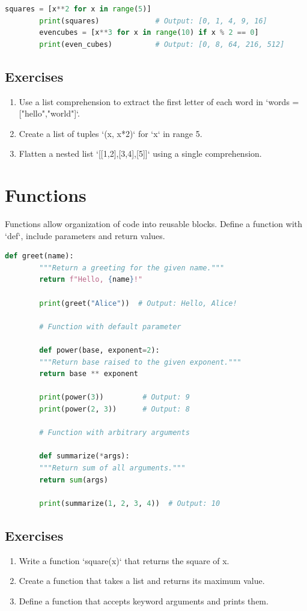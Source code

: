 \documentclass[a4paper,11pt]{article}
\begin{document}
	\begin{lstlisting}[language=Python]
		squares = [x**2 for x in range(5)]
		print(squares)             # Output: [0, 1, 4, 9, 16]
		evencubes = [x**3 for x in range(10) if x % 2 == 0]
		print(even_cubes)          # Output: [0, 8, 64, 216, 512]
	\end{lstlisting}
	
	\subsection*{Exercises}
	\begin{enumerate}
		\item Use a list comprehension to extract the first letter of each word in `words = ["hello","world"]`.
		\item Create a list of tuples `(x, x*2)` for `x` in range 5.
		\item Flatten a nested list `[[1,2],[3,4],[5]]` using a single comprehension.
	\end{enumerate}
	
	\section{Functions}
	Functions allow organization of code into reusable blocks. Define a function with `def`, include parameters and return values.
	
	\begin{lstlisting}[language=Python]
		def greet(name):
		"""Return a greeting for the given name."""
		return f"Hello, {name}!"
		
		print(greet("Alice"))  # Output: Hello, Alice!
		
		# Function with default parameter
		
		def power(base, exponent=2):
		"""Return base raised to the given exponent."""
		return base ** exponent
		
		print(power(3))         # Output: 9
		print(power(2, 3))      # Output: 8
		
		# Function with arbitrary arguments
		
		def summarize(*args):
		"""Return sum of all arguments."""
		return sum(args)
		
		print(summarize(1, 2, 3, 4))  # Output: 10
	\end{lstlisting}
	
	\subsection*{Exercises}
	\begin{enumerate}
		\item Write a function `square(x)` that returns the square of x.
		\item Create a function that takes a list and returns its maximum value.
		\item Define a function that accepts keyword arguments and prints them.
	\end{enumerate}
	
\end{document}
